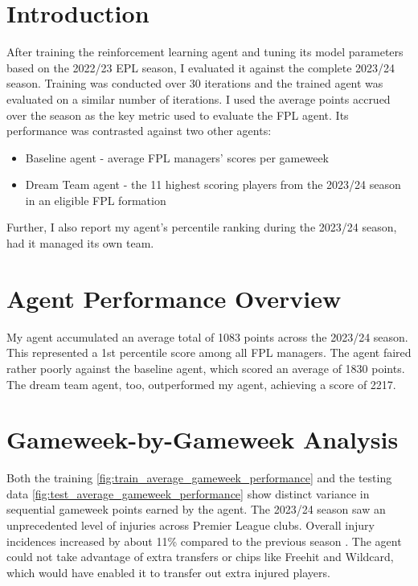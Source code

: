 \section{Introduction}
After training the reinforcement learning agent and tuning its model parameters based on the 2022/23 EPL season, I evaluated it against the complete 2023/24 season. Training was conducted over 30 iterations and the trained agent was evaluated on a similar number of iterations. I used the average points accrued over the season as the key metric used to evaluate the FPL agent. Its performance was contrasted against two other agents:
\begin{itemize}
    \item Baseline agent - average FPL managers' scores per gameweek
    \item Dream Team agent - the 11 highest scoring players from the 2023/24 season in an eligible FPL formation
\end{itemize}
Further, I also report my agent's percentile ranking during the 2023/24 season, had it managed its own team.

\section{Agent Performance Overview}
My agent accumulated an average total of 1083 points across the 2023/24 season. This represented a 1st percentile score among all FPL managers. The agent faired rather poorly against the baseline agent, which scored an average of 1830 points. The dream team agent, too, outperformed my agent, achieving a score of 2217. \cite{fantasyfootballpundit2024}

\section{Gameweek-by-Gameweek Analysis}
Both the training \ref{fig:train_average_gameweek_performance} and the testing data \ref{fig:test_average_gameweek_performance} show distinct variance in sequential gameweek points earned by the agent. The 2023/24 season saw an unprecedented level of injuries across Premier League clubs. Overall injury incidences increased by about 11\% compared to the previous season \cite{analyticsFC2024}. The agent could not take advantage of extra transfers or chips like Freehit and Wildcard, which would have enabled it to transfer out extra injured players.

